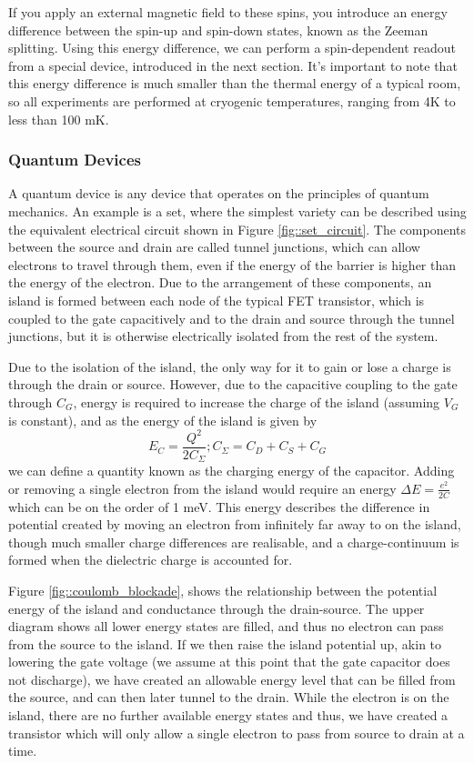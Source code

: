 	\label{zeeman}
	If you apply an external magnetic field to these spins, you introduce an energy difference between the spin-up and spin-down states, known as the Zeeman splitting. Using this energy difference, we can perform a spin-dependent readout from a special device, introduced in the next section. It's important to note that this energy difference is much smaller than the thermal energy of a typical room, so all experiments are performed at cryogenic temperatures, ranging from 4K to less than 100 mK. \cite{morello2010single}
	
\subsubsection{Quantum Devices}
	\label{sec::set}
	A quantum device is any device that operates on the principles of quantum mechanics. An example is a \gls{set}, where the simplest variety can be described using the equivalent electrical circuit \cite{devoret2000amplifying} shown in Figure \ref{fig::set_circuit}. The components between the source and drain are called tunnel junctions, which can allow electrons to travel through them, even if the energy of the barrier is higher than the energy of the electron. Due to the arrangement of these components, an island is formed between each node of the typical FET transistor, which is coupled to the gate capacitively and to the drain and source through the tunnel junctions, but it is otherwise electrically isolated from the rest of the system.
	
	Due to the isolation of the island, the only way for it to gain or lose a charge is through the drain or source. However, due to the capacitive coupling to the gate through $C_G$, energy is required to increase the charge of the island (assuming $V_G$ is constant), and as the energy of the island is given by $$E_C = \frac{Q^2}{2 C_\Sigma} ; C_\Sigma = C_D + C_S + C_G$$ we can define a quantity known as the charging energy of the capacitor. Adding or removing a single electron from the island would require an energy $\Delta E = \frac{e^2}{2 C}$ which can be on the order of 1 meV. This energy describes the difference in potential created by moving an electron from infinitely far away to on the island, though much smaller charge differences are realisable, and a charge-continuum is formed when the dielectric charge is accounted for.
	
	
	
	
	
	Figure \ref{fig::coulomb_blockade}, shows the relationship between the potential energy of the island and conductance through the drain-source. The upper diagram shows all lower energy states are filled, and thus no electron can pass from the source to the island. If we then raise the island potential up, akin to lowering the gate voltage
	 (we assume at this point that the gate capacitor does not discharge), 
	 we have created an allowable energy level that can be filled from the source, and can then later tunnel to the drain. While the electron is on the island, there are no further available energy states and thus, we have created a transistor which will only allow a single electron to pass from source to drain at a time.
	
